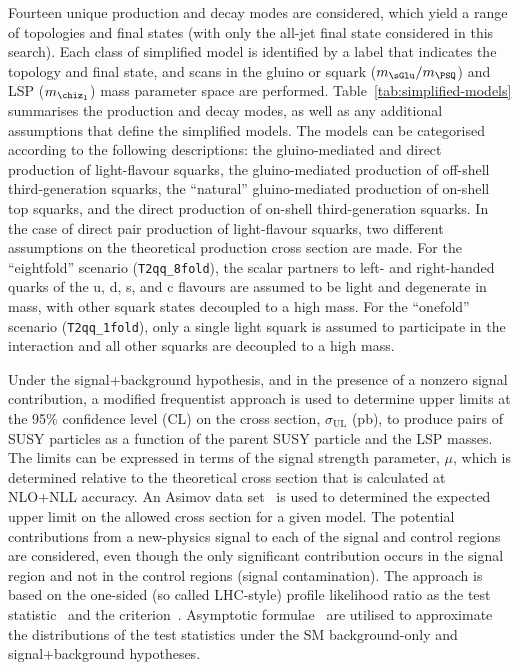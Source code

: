 Fourteen unique production and decay modes are considered, which yield
a range of topologies and final states (with only the all-jet final
state considered in this search). Each class of simplified model is
identified by a label that indicates the topology and final state, and
scans in the gluino or squark ($m_{\sGlu} / m_{\PSQ}$) and LSP
($m_{\chiz_1}$) mass parameter space are performed.
Table~\ref{tab:simplified-models} summarises the production and decay
modes, as well as any additional assumptions that define the
simplified models. The models can be categorised according to the
following descriptions: the gluino-mediated and direct production of
light-flavour squarks, the gluino-mediated production of off-shell
third-generation squarks, the ``natural'' gluino-mediated production
of on-shell top squarks, and the direct production of on-shell
third-generation squarks. In the case of direct pair production of
light-flavour squarks, two different assumptions on the theoretical 
production cross section are made. For the ``eightfold'' scenario
(\texttt{T2qq\_8fold}), the scalar partners to left- and right-handed
quarks of the u, d, s, and c flavours are assumed to be light and
degenerate in mass, with other squark states decoupled to a high
mass. For the ``onefold'' scenario (\texttt{T2qq\_1fold}), only a
single light squark is assumed to participate in the interaction and
all other squarks are decoupled to a high mass.

Under the signal+background hypothesis, and in the presence of a
nonzero signal contribution, a modified frequentist approach is used
to determine upper limits at the 95\% confidence level (CL) on the
cross section, $\sigma_\text{UL}$ (pb), to produce pairs of SUSY
particles as a function of the parent SUSY particle and the LSP
masses. The limits can be expressed in terms of the signal strength
parameter, $\mu$, which is determined relative to the theoretical
cross section that is calculated at NLO+NLL accuracy. An Asimov data
set~\cite{Cowan:2010js} is used to determined the expected upper limit
on the allowed cross section for a given model.  The potential
contributions from a new-physics signal to each of the signal and
control regions are considered, even though the only significant
contribution occurs in the signal region and not in the control
regions (\ie signal contamination). The approach is based on the
one-sided (so called LHC-style) profile likelihood ratio as the test
statistic~\cite{CMS-NOTE-2011-005} and the \cls criterion~\cite{junk,
  read}. Asymptotic formulae~\cite{Cowan:2010js} are utilised to
approximate the distributions of the test statistics under the SM
background-only and signal+background hypotheses.

